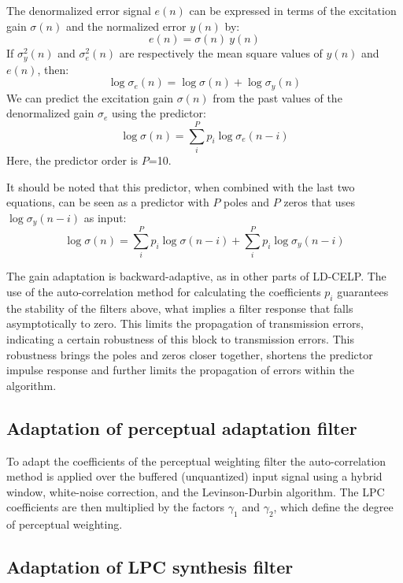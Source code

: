 The denormalized error signal $e(n)$ can be expressed in terms of the
excitation gain $\sigma(n)$ and the normalized error $y(n)$ by:
\[
      e(n) = \sigma(n) \ y(n)
\]
If $\sigma_y^2(n)$ and $\sigma_e^2(n)$ are respectively the mean
square values of $y(n)$ and $e(n)$, then:
\[
      \log \sigma_e(n) = \log \sigma(n) + \log \sigma_y(n)
\]
We can predict the excitation gain $\sigma(n)$ from the past values of
the denormalized gain $\sigma_e$ using the predictor:
\[
      \log \sigma(n) = \sum_i^P p_i \log \sigma_e(n - i)
\]
Here, the predictor order is $P$=10.

It should be noted that this predictor, when combined with the last
two equations, can be seen as a predictor with $P$ poles and $P$
zeros that uses $\log\sigma_y(n-i)$ as input:
\[
      \log \sigma(n) =   \sum_i^P p_i \log \sigma  (n - i) 
                       + \sum_i^P p_i \log \sigma_y(n - i)
\]

The gain adaptation is backward-adaptive, as in other parts of
LD-CELP. The use of the auto-correlation method for calculating the
coefficients $p_i$ guarantees the stability of the filters above, what
implies a filter response that falls asymptotically to zero. This
limits the propagation of transmission errors, indicating a certain
robustness of this block to transmission errors. This robustness 
brings the poles and zeros closer together, shortens the predictor impulse
response and further limits the propagation of errors within the algorithm.

\subsection{Adaptation of perceptual adaptation filter} 

To adapt the coefficients of the perceptual weighting filter the
auto-correlation method is applied over the buffered (unquantized) input
signal using a hybrid window, white-noise correction, and
the Levinson-Durbin algorithm. The LPC coefficients are then
multiplied by the factors $\gamma_1$ and $\gamma_2$, which define the
degree of perceptual weighting.

\subsection{Adaptation of LPC synthesis filter}

